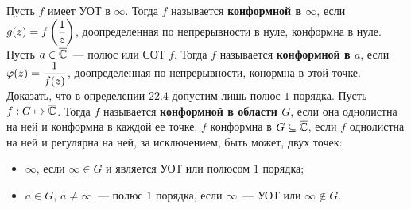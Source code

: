 \Def
Пусть $f$ имеет УОТ в $\infty$. Тогда $f$ называется \textbf{конформной в
  $\infty$}, если $g(z) = f\left( \displaystyle \frac{1}{z} \right)$, доопределенная по
непрерывности в нуле, конформна в нуле.
\Def
Пусть $a \in \overline{\mathbb{C}}$~--- полюс или СОТ $f$. Тогда $f$ называется
\textbf{конформной в $a$}, если $\varphi(z) = \displaystyle \frac{1}{f(z)}$,
доопределенная по непрерывности, конормна в этой точке.
\Exse
Доказать, что в определении $22.4$ допустим лишь полюс $1$ порядка.
\Def
Пусть $f: G \mapsto \overline{\mathbb{C}}$. Тогда $f$ называется \textbf{конформной в области
  $G$}, если она однолистна на ней и конформна в каждой ее точке.
\prop
$f$ конформна в $G \subseteq \overline{\mathbb{C}}$, если $f$ однолистна на ней и регулярна на
ней, за исключением, быть может, двух точек:
\begin{itemize}
    \item $\infty$, если $\infty \in G$ и является УОТ или полюсом $1$ порядка;
    \item $a \in G$, $a \neq \infty$~--- полюс $1$ порядка, если $\infty$~---
    УОТ или $\infty \not \in G$.
\end{itemize}
